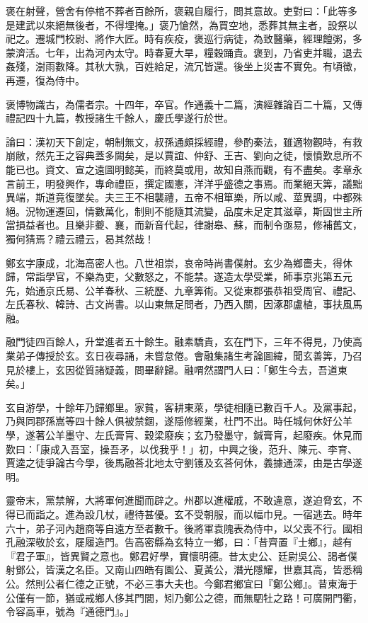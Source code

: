 \begin{pinyinscope}
褒在射聲，營舍有停棺不葬者百餘所，褒親自履行，問其意故。吏對曰：「此等多是建武以來絕無後者，不得埋掩。」褒乃愴然，為買空地，悉葬其無主者，設祭以祀之。遷城門校尉、將作大匠。時有疾疫，褒巡行病徒，為致醫藥，經理饘粥，多蒙濟活。七年，出為河內太守。時春夏大旱，糧穀踊貴。褒到，乃省吏并職，退去姦殘，澍雨數降。其秋大孰，百姓給足，流冗皆還。後坐上災害不實免。有頃徵，再遷，復為侍中。

褒博物識古，為儒者宗。十四年，卒官。作通義十二篇，演經雜論百二十篇，又傳禮記四十九篇，教授諸生千餘人，慶氏學遂行於世。

論曰：漢初天下創定，朝制無文，叔孫通頗採經禮，參酌秦法，雖適物觀時，有救崩敝，然先王之容典蓋多闕矣，是以賈誼、仲舒、王吉、劉向之徒，懷憤歎息所不能已也。資文、宣之遠圖明懿美，而終莫或用，故知自燕而觀，有不盡矣。孝章永言前王，明發興作，專命禮臣，撰定國憲，洋洋乎盛德之事焉。而業絕天筭，議黜異端，斯道竟復墜矣。夫三王不相襲禮，五帝不相箪樂，所以咸、莖異調，中都殊絕。況物運遷回，情數萬化，制則不能隨其流變，品度未足定其滋章，斯固世主所當損益者也。且樂非夔、襄，而新音代起，律謝皋、蘇，而制令亟易，修補舊文，獨何猜焉？禮云禮云，曷其然哉！

鄭玄字康成，北海高密人也。八世祖崇，哀帝時尚書僕射。玄少為鄉嗇夫，得休歸，常詣學官，不樂為吏，父數怒之，不能禁。遂造太學受業，師事京兆第五元先，始通京氏易、公羊春秋、三統歷、九章筭術。又從東郡張恭祖受周官、禮記、左氏春秋、韓詩、古文尚書。以山東無足問者，乃西入關，因涿郡盧植，事扶風馬融。

融門徒四百餘人，升堂進者五十餘生。融素驕貴，玄在門下，三年不得見，乃使高業弟子傳授於玄。玄日夜尋誦，未嘗怠倦。會融集諸生考論圖緯，聞玄善筭，乃召見於樓上，玄因從質諸疑義，問畢辭歸。融喟然謂門人曰：「鄭生今去，吾道東矣。」

玄自游學，十餘年乃歸鄉里。家貧，客耕東萊，學徒相隨已數百千人。及黨事起，乃與同郡孫嵩等四十餘人俱被禁錮，遂隱修經業，杜門不出。時任城何休好公羊學，遂著公羊墨守、左氏膏肓、穀梁廢疾；玄乃發墨守，鍼膏肓，起廢疾。休見而歎曰：「康成入吾室，操吾矛，以伐我乎！」初，中興之後，范升、陳元、李育、賈逵之徒爭論古今學，後馬融荅北地太守劉镬及玄荅何休，義據通深，由是古學遂明。

靈帝末，黨禁解，大將軍何進聞而辟之。州郡以進權戚，不敢違意，遂迫脅玄，不得已而詣之。進為設几杖，禮待甚優。玄不受朝服，而以幅巾見。一宿逃去。時年六十，弟子河內趙商等自遠方至者數千。後將軍袁隗表為侍中，以父喪不行。國相孔融深敬於玄，屣履造門。告高密縣為玄特立一鄉，曰：「昔齊置『士鄉』，越有『君子軍』，皆異賢之意也。鄭君好學，實懷明德。昔太史公、廷尉吳公、謁者僕射鄧公，皆漢之名臣。又南山四皓有園公、夏黃公，潛光隱耀，世嘉其高，皆悉稱公。然則公者仁德之正號，不必三事大夫也。今鄭君鄉宜曰『鄭公鄉』。昔東海于公僅有一節，猶或戒鄉人侈其門閭，矧乃鄭公之德，而無駟牡之路！可廣開門衢，令容高車，號為『通德門』。」


\end{pinyinscope}

